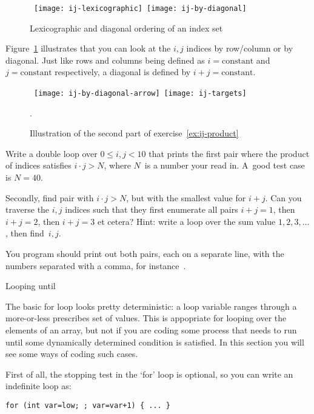 \begin{figure}[ht]
  \hbox{%
    \texttt{[image: ij-lexicographic]}
    \texttt{[image: ij-by-diagonal]}
    }
  \caption{Lexicographic and diagonal ordering of an index set}  
  \label{fig:ij-lex}
\end{figure}

Figure~\ref{fig:ij-lex} illustrates that you can look at the $i,j$
indices by row/column or by diagonal. Just like rows and columns being
defined as $i=\mathrm{constant}$ and $j=\mathrm{constant}$
respectively,
a diagonal is defined by $i+j=\mathrm{constant}$.

\begin{figure}[ht]
  \hbox{%
    \texttt{[image: ij-by-diagonal-arrow]}
    \texttt{[image: ij-targets]}
    }
  \caption{Illustration of the second part of exercise~\ref{ex:ij-product}}.
  \label{fig:ij-min}
\end{figure}

\begin{exercise}
  \label{ex:ij-product}
  Write a double loop over $0\leq i,j<10$ that prints the first pair
  where the product of indices satisfies $i\cdot j> N$, where $N$~is a
  number your read in. A~good test case is $N=40$.

  Secondly, find pair with $i\cdot j>N$, but with the smallest value for $i+j$.
  Can you traverse the $i,j$ indices such that they first enumerate
  all pairs $i+j=1$, then $i+j=2$, then $i+j=3$ et cetera? Hint:
  write a loop over the sum value $1,2,3,\ldots$, then find~$i,j$.

  You program should print out both pairs, each on a separate line,
  with the numbers separated with a comma, for instance~.
\end{exercise}

 {Looping until}
\label{sec:loopuntil}

The basic for loop looks pretty deterministic: a loop variable ranges
through a more-or-less prescribes set of values. This is appopriate
for looping over the elements of an array, but not if you are coding
some process that needs to run until some dynamically determined
condition is satisfied. In this section you will see some ways of
coding such cases.

First of all, the stopping test in the `for' loop is optional, so you
can write an indefinite loop as:
\begin{verbatim}
for (int var=low; ; var=var+1) { ... }
\end{verbatim}

